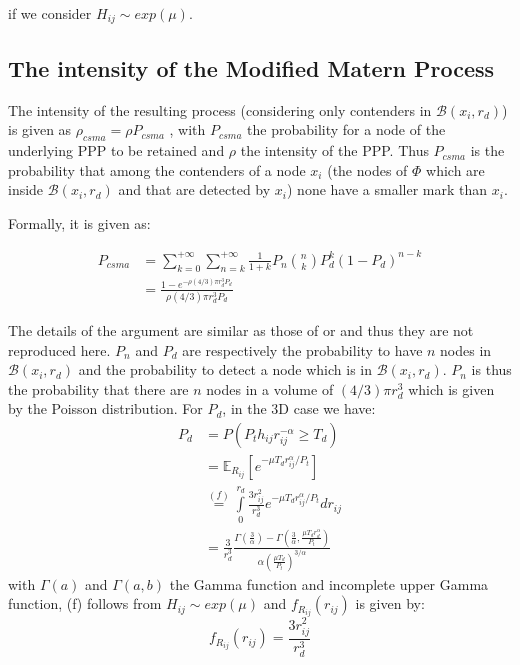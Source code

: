 \documentclass{sig-alternate-05-2015}
\begin{document}
if we consider $H_{ij}\sim exp(\mu)$.

\subsection{The intensity of the Modified Matern Process}
\label{intensitysec}

The intensity of the resulting process (considering only contenders in $\mathcal{B}(x_i,r_d)$) is given as $\rho_{csma}=\rho P_{csma}$ \cite{stoyan87}, with $P_{csma}$ the probability for a node of the underlying PPP to be retained and $\rho$ the intensity of the PPP. Thus $P_{csma}$ is the probability that among the contenders of a node $x_i$ (the nodes of $\Phi$ which are inside $\mathcal{B}(x_i,r_d)$ and that are detected by $x_i$) none have a smaller mark than $x_i$.

Formally, it is given as:

\begin{align}
 \label{pcsmaeq}
 P_{csma}&=\sum \limits_{k=0}^{+\infty} \sum \limits_{n=k}^{+\infty} \frac{1}{1+k} P_n \binom{n}{k} P_d^k (1-P_d)^{n-k} \nonumber\\
 &=\frac{1-e^{-\rho (4/3) \pi r_d^3 P_d}}{\rho (4/3) \pi r_d^3 P_d}
\end{align}

The details of the argument are similar as those of \cite{nguyen07} or \cite{elsawy13} and thus they are not reproduced here. $P_n$ and $P_d$ are respectively the probability to have $n$ nodes in $\mathcal{B}(x_i,r_d)$ and the probability to detect a node which is in $\mathcal{B}(x_i,r_d)$. $P_n$ is thus the probability that there are $n$ nodes in a volume of $(4/3) \pi r_d^3$ which is given by the Poisson distribution. For $P_d$, in the 3D case we have:
\begin{align}
 P_d&=P(P_t h_{ij} r_{ij}^{-\alpha}\geq T_d) \nonumber\\
& = \mathbb{E}_{R_{ij}}\left[ e^{-\mu T_d r_{ij}^{\alpha} / P_t} \right] \nonumber\\
 & \stackrel{(f)}{=} \int \limits_{0}^{r_d} \frac{3 r_{ij}^2}{r_d^3} e^{-\mu T_d r_{ij}^{\alpha} / P_t} dr_{ij} \nonumber\\
 & = \frac{3}{r_d^3} \frac{\Gamma(\frac{3}{\alpha})-\Gamma(\frac{3}{\alpha},\frac{ \mu T_dr_d^{\alpha}}{P_t })}{\alpha \left(\frac{\mu T_d}{P_t}\right)^{3/\alpha}} \label{pdeq}
\end{align}
with $\Gamma(a)$ and $\Gamma(a,b)$ the Gamma function and incomplete upper Gamma function, (f) follows from  $H_{ij}\sim exp(\mu)$ and $f_{R_{ij}}(r_{ij})$ is given by:
\begin{equation}
  f_{R_{ij}}(r_{ij})=\frac{3 r_{ij}^2}{r_d^3}
  \label{frijeq}
\end{equation}
\end{document}

